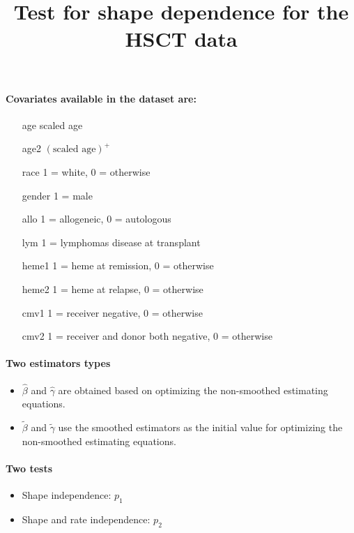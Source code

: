 \documentclass[a4paper,10pt]{article}
\title{Test for shape dependence for the HSCT data}
\author{}
\date{}
\begin{document}
\maketitle
\thispagestyle{empty} 
\pagestyle{empty}

\noindent

\paragraph{Covariates available in the dataset are:}
\begin{itemize}
\item[age] scaled age
\item[age2] $(\mbox{scaled age})^+$
\item[race] 1 = white, 0 = otherwise
\item[gender] 1 = male
\item[allo] 1 = allogeneic, 0 = autologous
\item[lym] 1 = lymphomas disease at transplant
\item[heme1] 1 = heme at remission, 0 = otherwise
\item[heme2] 1 = heme at relapse, 0 = otherwise
\item[cmv1] 1 = receiver negative, 0 = otherwise
\item[cmv2] 1 = receiver and donor both negative, 0 = otherwise
\end{itemize}
\paragraph{Two estimators types}
\begin{itemize}
\item $\widehat\beta$ and $\widehat\gamma$ are obtained based on optimizing the non-smoothed estimating equations.
\item $\widetilde\beta$ and $\widetilde\gamma$ use the smoothed estimators as the initial value for optimizing the non-smoothed estimating equations.
\end{itemize}
\paragraph{Two tests}
\begin{itemize}
\item Shape independence: $p_1$
\item Shape and rate independence: $p_2$
\end{itemize}
\end{document}
